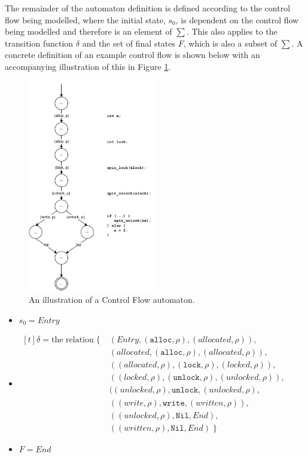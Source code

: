 \noindent The remainder of the automaton definition is defined according to the control flow being modelled, where the initial state, $s_0$, is dependent on the control flow being modelled and therefore is an element of $\sum$. This also applies to the transition function $\delta$ and the set of final states $F$, which is also a subset of $\sum$. A concrete definition of an example control flow is shown below with an accompanying illustration of this in Figure \ref{cfg_example-automaton}.

\begin{figure}[H]
    \centering
    \includegraphics[width=0.5\textwidth]{algorithm/figures/cfg_example}
    \caption{An illustration of a Control Flow automaton.}
    \label{cfg_example-automaton}
\end{figure}

\begin{itemize}
    \item $s_0 = Entry$ 
    \item {
        $
            \begin{aligned}[t]
            \delta = \text{the relation} \; \{ \; & (Entry, (\texttt{alloc},\rho), (allocated, \rho)), \\ 
            & (allocated, (\texttt{alloc},\rho), (allocated, \rho)), \\ 
            & ((allocated, \rho), (\texttt{lock}, \rho), (locked, \rho)), \\
            & ((locked, \rho), (\texttt{unlock}, \rho), (unlocked, \rho)), \\
            & ((unlocked, \rho), \texttt{unlock}, (unlocked, \rho), \\ 
            & ((write, \rho), \texttt{write}, (written, \rho)), \\ 
            & ((unlocked, \rho), \texttt{Nil}, End), \\ 
            & ((written, \rho), \texttt{Nil}, End) \; \}
            \end{aligned}
        $ 
    }
    \item $F = End$
\end{itemize}

